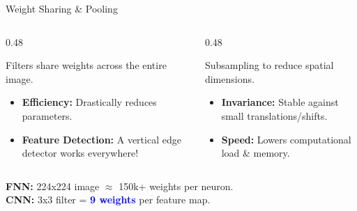\documentclass[aspectratio=169,xcolor=dvipsnames,svgnames,x11names,fleqn]{beamer}
\begin{document}
\begin{frame}[fragile]{Weight Sharing \& Pooling}
    \begin{columns}[T]
        \begin{column}{0.48\textwidth}
            \begin{tcolorbox}[colback=white, colframe=neonBlue, title=\small Weight Sharing, left=1mm]
                \scriptsize
                Filters share weights across the entire image.
                \begin{itemize}
                    \item \textbf{Efficiency:} Drastically reduces parameters.
                    \item \textbf{Feature Detection:} A vertical edge detector works everywhere!
                \end{itemize}
            \end{tcolorbox}
        \end{column}
        
        \begin{column}{0.48\textwidth}
            \begin{tcolorbox}[colback=white, colframe=neonGreen!70!black, title=\small Pooling, left=1mm]
                \scriptsize
                Subsampling to reduce spatial dimensions.
                \begin{itemize}
                    \item \textbf{Invariance:} Stable against small translations/shifts.
                    \item \textbf{Speed:} Lowers computational load \& memory.
                \end{itemize}
            \end{tcolorbox}
        \end{column}
    \end{columns}

    \vspace{0.4cm}

    \begin{exampleblock}{}
        \centering \small
        \textbf{FNN:} 224x224 image $\approx$ 150k+ weights per neuron. \\
        \textbf{CNN:} 3x3 filter = \textcolor{blue}{\textbf{9 weights}} per feature map.
    \end{exampleblock}
\end{frame}
\end{document}
